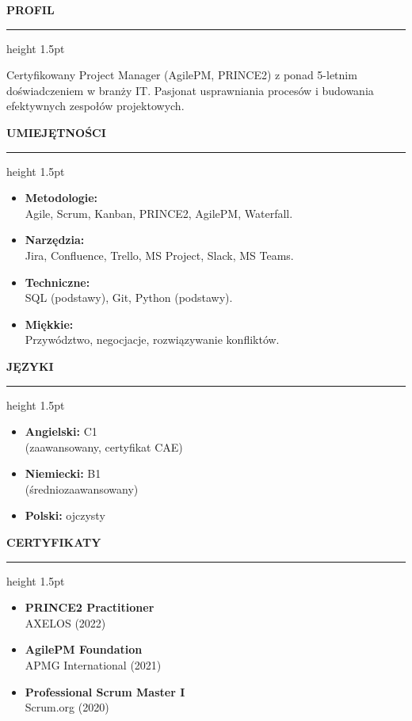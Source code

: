 \documentclass[10pt, a4paper]{article}
\newcommand{\cvsection}[1]{%
  \vspace{12pt}%
  {\color{primary}\large\bfseries\MakeUppercase{#1}}%
  \vspace{3pt}%
  {{\color{accent}\hrule height 1.5pt}}%
  \vspace{8pt}%
}
\begin{document}
\begin{minipage}[t]{0.28\textwidth}
  \vspace{0pt}
  
  \cvsection{Profil}
  Certyfikowany Project Manager (AgilePM, PRINCE2) z ponad 5-letnim doświadczeniem w branży IT. Pasjonat usprawniania procesów i budowania efektywnych zespołów projektowych.
  
  \cvsection{Umiejętności}
  \begin{itemize}[leftmargin=*, noitemsep, topsep=0pt, label={\color{accent}\tiny$\blacksquare$}]
    \item \textbf{Metodologie:} \\ Agile, Scrum, Kanban, PRINCE2, AgilePM, Waterfall.
    \item \textbf{Narzędzia:} \\ Jira, Confluence, Trello, MS Project, Slack, MS Teams.
    \item \textbf{Techniczne:} \\ SQL (podstawy), Git, Python (podstawy).
    \item \textbf{Miękkie:} \\ Przywództwo, negocjacje, rozwiązywanie konfliktów.
  \end{itemize}
  
  \cvsection{Języki}
  \begin{itemize}[leftmargin=*, noitemsep, topsep=0pt, label={\color{accent}\tiny$\blacksquare$}]
    \item \textbf{Angielski:} C1 \\ (zaawansowany, certyfikat CAE)
    \item \textbf{Niemiecki:} B1 \\ (średniozaawansowany)
    \item \textbf{Polski:} ojczysty
  \end{itemize}
  
  \cvsection{Certyfikaty}
  \begin{itemize}[leftmargin=*, noitemsep, topsep=0pt, label={\color{accent}\tiny$\blacksquare$}]
    \item \textbf{PRINCE2 Practitioner} \\ AXELOS (2022)
    \item \textbf{AgilePM Foundation} \\ APMG International (2021)
    \item \textbf{Professional Scrum Master I} \\ Scrum.org (2020)
  \end{itemize}

\end{minipage}%
\end{document}
